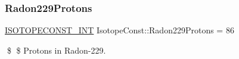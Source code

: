 \subsubsection{\texorpdfstring{Radon229\+Protons}{Radon229Protons}}
{\footnotesize\ttfamily \mbox{\hyperlink{group___isotope_const-_macros_ga5f18360b3e99483a35c32d789e62621c}{I\+S\+O\+T\+O\+P\+E\+C\+O\+N\+S\+T\+\_\+\+I\+NT}} Isotope\+Const\+::\+Radon229\+Protons = 86}

\$ \$ Protons in Radon-\/229. 